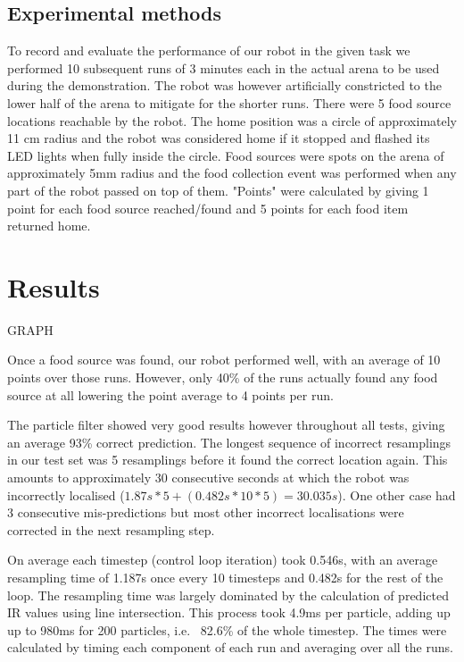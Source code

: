 \documentclass[paper=a4, fontsize=12pt]{scrartcl}	%
\numberwithin{equation}{section}		%
\numberwithin{figure}{section}			%
\numberwithin{table}{section}				%
\begin{document}
\subsection{Experimental methods}
To record and evaluate the performance of our robot in the given task we performed 10 subsequent runs of 3 minutes each in the actual arena to be used during the demonstration. The robot was however artificially constricted to the lower half of the arena to mitigate for the shorter runs. There were 5 food source locations reachable by the robot. The home position was a circle of approximately 11 cm radius and the robot was considered home if it stopped and flashed its LED lights when fully inside the circle. Food sources were spots on the arena of approximately 5mm radius and the food collection event was performed when any part of the robot passed on top of them. "Points" were calculated by giving 1 point for each food source reached/found and 5 points for each food item returned home.

\section{Results}
GRAPH

Once a food source was found, our robot performed well, with an average of 10 points over those runs. However, only 40\% of the runs actually found any food source at all lowering the point average to 4 points per run.

The particle filter showed very good results however throughout all tests, giving an average 93\% correct prediction. The longest sequence of incorrect resamplings in our test set was 5 resamplings before it found the correct location again. This amounts to approximately 30 consecutive seconds at which the robot was incorrectly localised (\(1.87s * 5 + (0.482s * 10 * 5) = 30.035s\)). One other case had 3 consecutive mis-predictions but most other incorrect localisations were corrected in the next resampling step.

On average each timestep (control loop iteration) took 0.546s, with an average resampling time of 1.187s once every 10 timesteps and 0.482s for the rest of the loop. The resampling time was largely dominated by the calculation of predicted IR values using line intersection. This process took 4.9ms per particle, adding up up to 980ms for 200 particles, i.e. ~82.6\% of the whole timestep. The times were calculated by timing each component of each run and averaging over all the runs.
\end{document}
